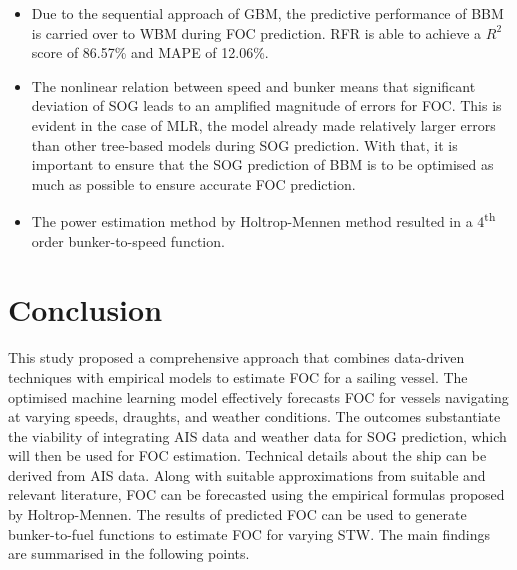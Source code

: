 \documentclass[]{interact}
\theoremstyle{plain}%
\theoremstyle{definition}
\theoremstyle{remark}
\begin{document}
\begin{itemize}

\item Due to the sequential approach of GBM, the predictive performance of BBM is carried over to WBM during FOC prediction. RFR is able to achieve a $R^2$ score of 86.57\% and MAPE of 12.06\%. 

\item The nonlinear relation between speed and bunker means that significant deviation of SOG leads to an amplified magnitude of errors for FOC. This is evident in the case of MLR, the model already made relatively larger errors than other tree-based models during SOG prediction. With that, it is important to ensure that the SOG prediction of BBM is to be optimised as much as possible to ensure accurate FOC prediction. 

\item The power estimation method by Holtrop-Mennen method resulted in a 4\textsuperscript{th} order bunker-to-speed function.
 
\end{itemize}

\section{Conclusion}

This study proposed a comprehensive approach that combines data-driven techniques with empirical models to estimate FOC for a sailing vessel. The optimised machine learning model effectively forecasts FOC for vessels navigating at varying speeds, draughts, and weather conditions. The outcomes substantiate the viability of integrating AIS data and weather data for SOG prediction, which will then be used for FOC estimation. Technical details about the ship can be derived from AIS data. Along with suitable approximations from suitable and relevant literature, FOC can be forecasted using the empirical formulas proposed by Holtrop-Mennen. The results of predicted FOC can be used to generate bunker-to-fuel functions to estimate FOC for varying STW. The main findings are summarised in the following points.\\
\end{document}
